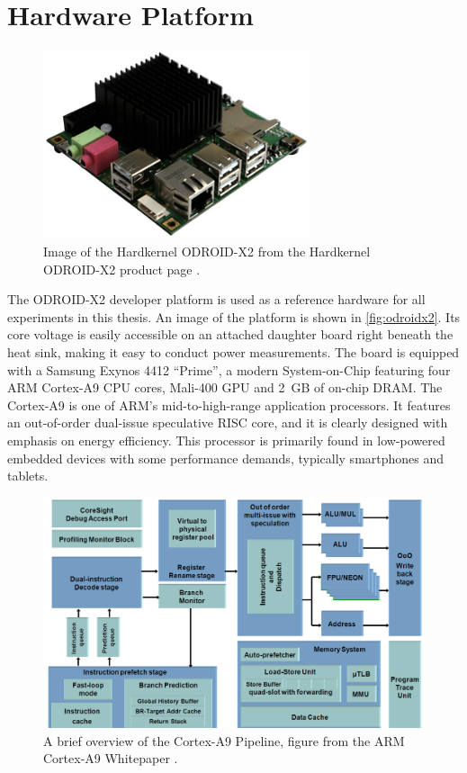 \section{Hardware Platform}
\label{sec:hw}

\begin{figure}[bth]
    \centering
    \includegraphics[width=0.7\textwidth]{figs/odroid.jpg}
    \caption{Image of the Hardkernel ODROID-X2 from the Hardkernel ODROID-X2
    product page \cite{hardkernelodroidx2}.}
    \label{fig:odroidx2}
\end{figure}

The ODROID-X2 developer platform \cite{hardkernelodroidx2} is used as a
reference hardware for all experiments in this thesis. An image of the platform
is shown in \autoref{fig:odroidx2}. Its core voltage is easily accessible on an
attached daughter board right beneath the heat sink, making it easy to conduct
power measurements. The board is equipped with a Samsung Exynos 4412 ``Prime'',
a modern System-on-Chip featuring four ARM Cortex-A9 CPU cores, Mali-400 GPU and
2~GB of on-chip DRAM. The Cortex-A9 is one of ARM's mid-to-high-range application
processors. It features an out-of-order dual-issue speculative RISC core, and it
is clearly designed with emphasis on energy efficiency. This processor is
primarily found in low-powered embedded devices with some performance demands,
typically smartphones and tablets.

\begin{figure}[bht]
    \centering
    \includegraphics[width=\textwidth]{figs/A9-Pipeline-hres.jpg}
    \caption{A brief overview of the Cortex-A9 Pipeline, figure from the ARM
    Cortex-A9 Whitepaper \cite{a9whitepaper}.}
    \label{fig:a9arch}
\end{figure}

